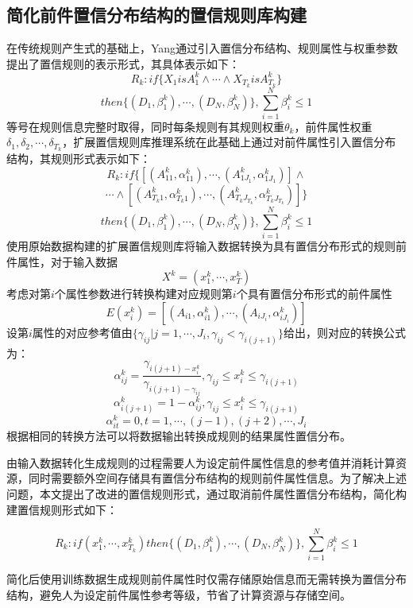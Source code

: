 \documentclass{cjc}
\begin{document}
\subsection{简化前件置信分布结构的置信规则库构建}
在传统规则产生式的基础上，Yang\cite{a3}通过引入置信分布结构、规则属性与权重参数提出了置信规则的表示形式，其具体表示如下：
$$R_k:if\{X_1isA_1^k \wedge \cdots \wedge X_{T_k}isA_{T_k}^k\}$$
$$then\{(D_1,\beta_1^k),\cdots,(D_N,\beta_N^k)\},\sum_{i=1}^N\beta_i^k\leq1$$
等号在规则信息完整时取得，同时每条规则有其规则权重$\theta_k$，前件属性权重$\delta_{1},\delta_{2},\cdots,\delta_{T_k}$，扩展置信规则库推理系统在此基础上通过对前件属性引入置信分布结构，其规则形式表示如下：
$$R_k:if\{[(A_{11}^k,\alpha_{11}^k),\cdots,(A_{1J_1}^k,\alpha_{1J_1}^k)] \wedge $$
$$\cdots \wedge [(A_{T_k1}^k,\alpha_{T_k1}^k), \cdots,(A_{T_kJ_{T_k}}^k,\alpha_{T_kJ_{T_k}}^k)]\}$$
$$then\{(D_1,\beta_1^k),\cdots,(D_N,\beta_N^k)\},\sum_{i=1}^N\beta_i^k\leq1$$
使用原始数据构建的扩展置信规则库将输入数据转换为具有置信分布形式的规则前件属性，对于输入数据
$$X^k=(x_1^k,\cdots,x_T^k)$$
考虑对第$i$个属性参数进行转换构建对应规则第$i$个具有置信分布形式的前件属性
$$E(x_i^k)=[(A_{i1},\alpha_{i1}^k),\cdots,(A_{iJ_i},\alpha_{iJ_i}^k)]$$
设第$i$属性的对应参考值由$\{\gamma_{ij}|j=1,\cdots,J_i,\gamma_{ij}<\gamma_{i(j+1)}\}$给出，则对应的转换公式为：
$$\alpha_{ij}^k=\frac{\gamma_{i(j+1)-x_i^k}}{\gamma_{i(j+1)-\gamma_{ij}}},\gamma_{ij}\leq x_i^k\leq \gamma_{i(j+1)}$$
$$\alpha_{i(j+1)}^k=1-\alpha_{ij}^k,\gamma_{ij}\leq x_i^k\leq \gamma_{i(j+1)}$$
$$\alpha_{it}^k=0,t=1,\cdots,(j-1),(j+2),\cdots,J_i$$
根据相同的转换方法可以将数据输出转换成规则的结果属性置信分布。

由输入数据转化生成规则的过程需要人为设定前件属性信息的参考值并消耗计算资源，同时需要额外空间存储具有置信分布结构的规则前件属性信息。为了解决上述问题，本文提出了改进的置信规则形式，通过取消前件属性置信分布结构，简化构建置信规则形式如下：
\begin{small}
    $$R_k:if(x_1^k , \cdots , x_{T_k}^k)then\{(D_1,\beta_1^k),\cdots,(D_N,\beta_N^k)\},\sum_{i=1}^N\beta_i^k\leq1$$
\end{small}
简化后使用训练数据生成规则前件属性时仅需存储原始信息而无需转换为置信分布结构，避免人为设定前件属性参考等级，节省了计算资源与存储空间。
\end{document}
